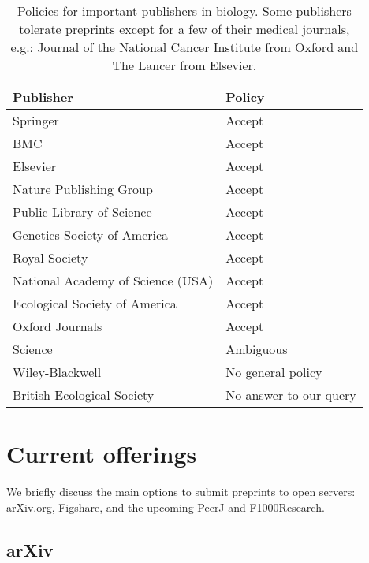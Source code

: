 \documentclass[letterpaper,twocolumn,superscriptaddress,showkeys,longbibliography]{revtex4-1}
\begin{document}
\begin{table*}
    \centering
    \begin{tabular}{|ll|}
    \hline
    Publisher                                   & Policy \\
    \hline
    Springer                            	& Accept \\
    BMC                                 	& Accept \\
    Elsevier                            	& Accept \\
    Nature Publishing Group             	& Accept \\
    Public Library of Science           	& Accept \\
    Genetics Society of America                 & Accept \\
    Royal Society                       	& Accept \\
    National Academy of Science (USA)           & Accept \\
    Ecological Society of America       	& Accept \\
    Oxford Journals                             & Accept \\
    Science                             	& Ambiguous \\
    Wiley-Blackwell                       	& No general policy \\
    British Ecological Society                  & No answer to our query \\
    \hline
    \end{tabular}
    \caption{Policies for important publishers in biology. Some publishers
tolerate preprints except for a few of their medical journals, e.g.: Journal
of the National Cancer Institute from Oxford and The Lancer from Elsevier.}
    \label{table:policies}
\end{table*}

\section{Current offerings}

We briefly discuss the main options to submit preprints to open servers:
arXiv.org, Figshare, and the upcoming PeerJ and F1000Research.

\subsection{arXiv}
\end{document}
